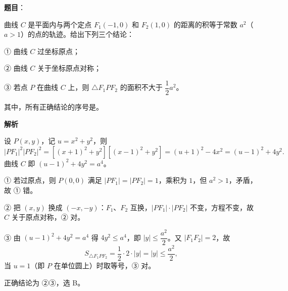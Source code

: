 \begin{answer}

\textbf{题目}：

曲线 $C$ 是平面内与两个定点 $F_1(-1,0)$ 和 $F_2(1,0)$ 的距离的积等于常数 $a^2$（$a>1$）的点的轨迹。给出下列三个结论：

① 曲线 $C$ 过坐标原点；

② 曲线 $C$ 关于坐标原点对称；

③ 若点 $P$ 在曲线 $C$ 上，则 $\triangle F_1PF_2$ 的面积不大于 $\dfrac12a^2$。

其中，所有正确结论的序号是\gkblank{}。

\textbf{解析}

设 $P(x,y)$，记 $u=x^2+y^2$，则
\nopagebreak[4]
\[
|PF_1|^2|PF_2|^2=\left[(x+1)^2+y^2\right]\left[(x-1)^2+y^2\right]=(u+1)^2-4x^2=(u-1)^2+4y^2.
\]
曲线 $C$ 即 $(u-1)^2+4y^2=a^4$。

① 若过原点，则 $P(0,0)$ 满足 $|PF_1|=|PF_2|=1$，乘积为 $1$，但 $a^2>1$，矛盾，故 ① 错。

② 把 $(x,y)$ 换成 $(-x,-y)$：$F_1$、$F_2$ 互换，$|PF_1|\cdot|PF_2|$ 不变，方程不变，故 $C$ 关于原点对称，② 对。

③ 由 $(u-1)^2+4y^2=a^4$ 得 $4y^2\leqslant a^4$，即 $|y|\leqslant\dfrac{a^2}{2}$。又 $|F_1F_2|=2$，故
\nopagebreak[4]
\[
S_{\triangle F_1PF_2}=\frac12\cdot2\cdot|y|=|y|\leqslant\frac{a^2}{2},
\]
当 $u=1$（即 $P$ 在单位圆上）时取等号，③ 对。

正确结论为 ②③，选 B。


\end{answer}
